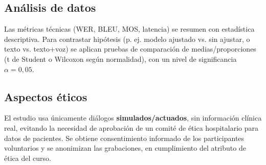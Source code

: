 \documentclass[12pt,a4paper]{article}
\begin{document}
\subsection{An{\'a}lisis de datos}
Las m{\'e}tricas t{\'e}cnicas (WER, BLEU, MOS, latencia) se resumen con estad{\'i}stica
descriptiva. Para contrastar hip{\'o}tesis (p. ej. modelo ajustado vs. sin ajustar, o
texto vs. texto+voz) se aplican pruebas de comparaci{\'o}n de medias/proporciones (t de Student
o Wilcoxon seg{\'u}n normalidad), con un nivel de significancia $\alpha = 0{,}05$.

\subsection{Aspectos {\'e}ticos}
El estudio usa {\'u}nicamente di{\'a}logos \textbf{simulados/actuados}, sin informaci{\'o}n
cl{\'i}nica real, evitando la necesidad de aprobaci{\'o}n de un comit{\'e} de {\'e}tica
hospitalario para datos de pacientes. Se obtiene consentimiento informado de los participantes
voluntarios y se anonimizan las grabaciones, en cumplimiento del atributo de {\'e}tica del curso.

\end{document}
